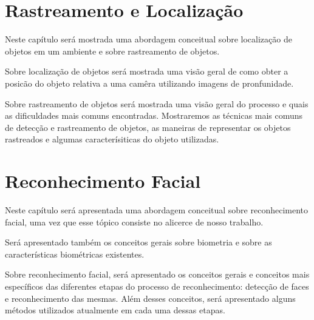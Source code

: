 \chapter{Rastreamento e Localização}

	Neste capítulo será mostrada uma abordagem conceitual sobre localização de objetos em um ambiente e sobre rastreamento de objetos.

	Sobre localização de objetos será mostrada uma visão geral de como obter a posicão do objeto relativa a uma camêra utilizando imagens de pronfunidade.

	Sobre rastreamento de objetos será mostrada uma visão geral do processo e quais as dificuldades mais comuns encontradas. Mostraremos as técnicas mais comuns de detecção e rastreamento de objetos, as maneiras de representar os objetos rastreados e algumas caracterísiticas do objeto utilizadas.

	
	

\chapter{Reconhecimento Facial}

	Neste capítulo será apresentada uma abordagem conceitual sobre reconhecimento facial, uma vez que esse tópico consiste no alicerce de nosso trabalho. 

	Será apresentado também os conceitos gerais sobre biometria e sobre as características biométricas existentes.

	Sobre reconhecimento facial, será apresentado os conceitos gerais e conceitos mais específicos das diferentes etapas do processo de reconhecimento: detecção de faces e reconhecimento das mesmas. Além desses conceitos, será apresentado alguns métodos utilizados atualmente em cada uma dessas etapas.


	
	






























